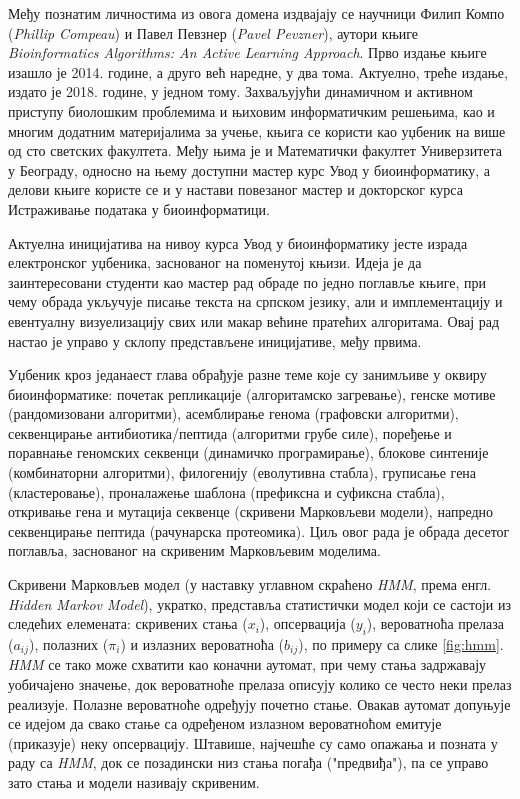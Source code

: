 \documentclass[12pt,oneside]{memoir}
\begin{document}
\begin{CJK}{UTF8}{ipxm}
Међу познатим личностима из овога домена издвајају се научници Филип Компо (\textit{Phillip Compeau}) и Павел Певзнер (\textit{Pavel Pevzner}), аутори књиге \textit{Bioinformatics Algorithms: An Active Learning Approach}. Прво издање књиге изашло је 2014. године, а друго већ наредне, у два тома. Актуелно, треће издање, издато је 2018. године, у једном тому. Захваљујући динамичном и активном приступу биолошким проблемима и њиховим информатичким решењима, као и многим додатним материјалима за учење, књига се користи као уџбеник на више од сто светских факултета\cite{ba}. Међу њима је и Математички факултет Универзитета у Београду, односно на њему доступни мастер курс Увод у биоинформатику, а делови књиге користе се и у настави повезаног мастер и докторског курса Истраживање података у биоинформатици\cite{matf}.

Актуелна иницијатива на нивоу курса Увод у биоинформатику јесте израда електронског уџбеника, заснованог на поменутој књизи. Идеја је да заинтересовани студенти као мастер рад обраде по једно поглавље књиге, при чему обрада укључује писање текста на српском језику, али и имплементацију и евентуалну визуелизацију свих или макар већине пратећих алгоритама. Овај рад настао је управо у склопу представљене иницијативе, међу првима.

Уџбеник кроз једанаест глава обрађује разне теме које су занимљиве у оквиру биоинформатике: почетак репликације (алгоритамско загревање), генске мотиве (рандомизовани алгоритми), асемблирање генома (графовски алгоритми), секвенцирање антибиотика/пептида (алгоритми грубе силе), поређење и поравнање геномских секвенци (динамичко програмирање), блокове синтеније (комбинаторни алгоритми), филогенију (еволутивна стабла), груписање гена (кластеровање), проналажење шаблона (префиксна и суфиксна стабла), откривање гена и мутација секвенце (скривени Марковљеви модели), напредно секвенцирање пептида (рачунарска протеомика). Циљ овог рада је обрада десетог поглавља, заснованог на скривеним Марковљевим моделима\cite{compeau2015}.

Скривени Марковљев модел (у наставку углавном скраћено \textit{HMM}, према енгл. \textit{Hidden Markov Model}), укратко, представља статистички модел који се састоји из следећих елемената: скривених стања ($x_i$), опсервација ($y_i$), вероватноћа прелаза ($a_{ij}$), полазних ($\pi_i$) и излазних вероватноћа ($b_{ij}$), по примеру са слике \ref{fig:hmm}. \textit{HMM} се тако може схватити као коначни аутомат, при чему стања задржавају уобичајено значење, док вероватноће прелаза описују колико се често неки прелаз реализује. Полазне вероватноће одређују почетно стање. Овакав аутомат допуњује се идејом да свако стање са одређеном излазном вероватноћом емитује (приказује) неку опсервацију. Штавише, најчешће су само опажања и позната у раду са \textit{HMM}, док се позадински низ стања погађа ("предвиђа"), па се управо зато стања и модели називају скривеним\cite{stamp2021}.


\end{CJK}
\end{document}
